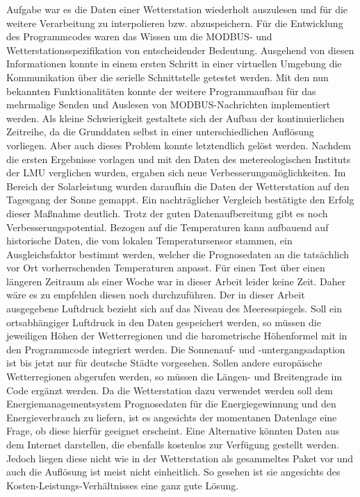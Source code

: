 Aufgabe war es die Daten einer Wetterstation wiederholt auszulesen und für die weitere Verarbeitung zu interpolieren bzw. abzuspeichern. Für die Entwicklung des Programmcodes waren das Wissen um die MODBUS- und Wetterstationsspezifikation von entscheidender Bedeutung. Ausgehend von diesen Informationen konnte in einem ersten Schritt in einer virtuellen Umgebung die Kommunikation über die serielle Schnittstelle getestet werden. Mit den nun bekannten Funktionalitäten konnte der weitere Programmaufbau für das mehrmalige Senden und Auslesen von MODBUS-Nachrichten implementiert werden. Als kleine Schwierigkeit gestaltete sich der Aufbau der kontinuierlichen Zeitreihe, da die Grunddaten selbst in einer unterschiedlichen Auflösung vorliegen. Aber auch dieses Problem konnte letztendlich gelöst werden. Nachdem die ersten Ergebnisse vorlagen und mit den Daten des metereologischen Instituts der LMU verglichen wurden, ergaben sich neue Verbesserungsmöglichkeiten. Im Bereich der Solarleistung wurden daraufhin die Daten der Wetterstation auf den Tagesgang der Sonne gemappt. Ein nachträglicher Vergleich bestätigte den Erfolg dieser Maßnahme deutlich. Trotz der guten Datenaufbereitung gibt es noch Verbesserungspotential. Bezogen auf die Temperaturen kann aufbauend auf historische Daten, die vom lokalen Temperatursensor stammen, ein Ausgleichsfaktor bestimmt werden, welcher die Prognosedaten an die tatsächlich vor Ort vorherrschenden Temperaturen anpasst. Für einen Test über einen längeren Zeitraum als einer Woche war in dieser Arbeit leider keine Zeit. Daher wäre es zu empfehlen diesen noch durchzuführen. Der in dieser Arbeit ausgegebene Luftdruck bezieht sich auf das Niveau des Meeresspiegels. Soll ein ortsabhängiger Luftdruck in den Daten gespeichert werden, so müssen die jeweiligen Höhen der Wetterregionen und die barometrische Höhenformel mit in den Programmcode integriert werden. Die Sonnenauf- und -untergangsadaption ist bis jetzt nur für deutsche Städte vorgesehen. Sollen andere europäische Wetterregionen abgerufen werden, so müssen die Längen- und Breitengrade im Code ergänzt werden.     Da die Wetterstation dazu verwendet werden soll dem Energiemanagementsystem Prognosedaten für die Energiegewinnung und den Energieverbrauch zu liefern, ist es angesichts der momentanen Datenlage eine Frage, ob diese hierfür geeignet erscheint. Eine Alternative könnten Daten aus dem Internet darstellen, die ebenfalls kostenlos zur Verfügung gestellt werden. Jedoch liegen diese nicht wie in der Wetterstation als gesammeltes Paket vor und auch die Auflösung ist meist nicht einheitlich. So gesehen ist sie angesichts des Kosten-Leistungs-Verhältnisses eine ganz gute Lösung.   